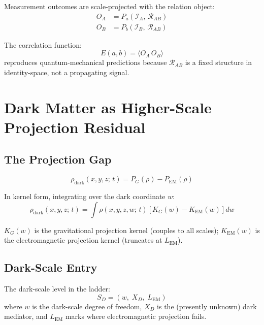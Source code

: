 \documentclass[11pt, a4paper, oneside]{article}
\theoremstyle{definition}
\theoremstyle{plain}
\theoremstyle{remark}
\begin{document}
Measurement outcomes are scale-projected with the relation object:
\begin{align}
  O_A &= P_a\!\left(\mathcal{I}_A,\, \mathcal{R}_{AB}\right) \\
  O_B &= P_b\!\left(\mathcal{I}_B,\, \mathcal{R}_{AB}\right)
\end{align}

The correlation function:
\begin{equation}
  E(a,b) = \langle O_A\, O_B \rangle
\end{equation}
reproduces quantum-mechanical predictions because $\mathcal{R}_{AB}$ is
a fixed structure in identity-space, not a propagating signal.

\section{Dark Matter as Higher-Scale Projection Residual}

\subsection{The Projection Gap}

\begin{equation}
  \rho_\text{dark}(x,y,z;\,t)
  = P_G(\rho) - P_\text{EM}(\rho)
  \label{eq:dark-def}
\end{equation}

In kernel form, integrating over the dark coordinate $w$:
\begin{equation}
  \boxed{
	\rho_\text{dark}(x,y,z;\,t)
	= \int \rho(x,y,z,w;\,t)
	  \left[K_G(w) - K_\text{EM}(w)\right] dw
  }
  \label{eq:dark-kernel}
\end{equation}

$K_G(w)$ is the gravitational projection kernel (couples to all scales);
$K_\text{EM}(w)$ is the electromagnetic projection kernel (truncates at
$L_\text{EM}$).

\subsection{Dark-Scale Entry}

The dark-scale level in the ladder:
\begin{equation}
  S_D = (w,\; X_D,\; L_\text{EM})
\end{equation}
where $w$ is the dark-scale degree of freedom, $X_D$ is the (presently
unknown) dark mediator, and $L_\text{EM}$ marks where electromagnetic
projection fails.
\end{document}
